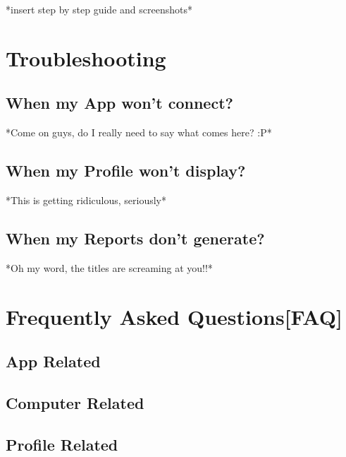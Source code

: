 \documentclass[11pt,fleqn]{book} %
\begin{document}
		*insert step by step guide and screenshots*



\chapter{Troubleshooting}
	\section{When my App won't connect?}
		*Come on guys, do I really need to say what comes here? :P*
	\section{When my Profile won't display?}
		*This is getting ridiculous, seriously*
	\section{When my Reports don't generate?}
		*Oh my word, the titles are screaming at you!!*


\chapter{Frequently Asked Questions[FAQ]}
	\section{App Related}
	\section{Computer Related}
	\section{Profile Related}
	
\end{document}
